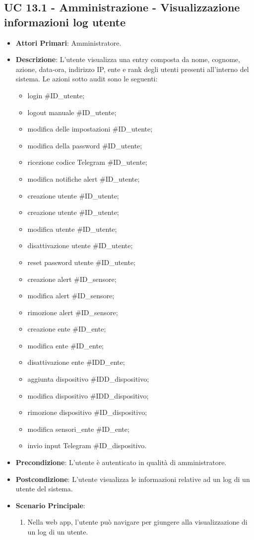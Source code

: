 		\subsection{UC 13.1 - Amministrazione - Visualizzazione informazioni log utente}
		\begin{itemize}
			\item \textbf{Attori Primari}: Amministratore.
			\item \textbf{Descrizione}: L'utente visualizza una entry composta da nome, cognome, azione, data-ora, indirizzo IP, ente e rank degli utenti presenti all'interno del sistema.
			Le azioni sotto audit sono le seguenti: 
			\begin{itemize}
				\item login #ID_utente;
				\item logout manuale #ID_utente;
				\item modifica delle impostazioni #ID_utente;
				\item modifica della password #ID_utente;
				\item ricezione codice Telegram #ID_utente;
				\item modifica notifiche alert #ID_utente;
				\item creazione utente #ID_utente;
				\item creazione utente #ID_utente;
				\item modifica utente #ID_utente;
				\item disattivazione utente #ID_utente;
				\item reset password utente #ID_utente;
				\item creazione alert #ID_sensore;
				\item modifica alert #ID_sensore;
				\item rimozione alert #ID_sensore;
				\item creazione ente #ID_ente;
				\item modifica ente #ID_ente;
				\item disattivazione ente #IDD_ente;
				\item aggiunta dispositivo #IDD_dispositivo;
				\item modifica dispositivo #IDD_dispositivo;
				\item rimozione dispositivo #ID_dispositivo;
				\item modifica sensori_ente #ID_ente;
				\item invio input Telegram #ID_dispositivo.
			\end{itemize}
			\item \textbf{Precondizione}: L'utente è autenticato in qualità di amministratore.
			\item \textbf{Postcondizione}: L'utente visualizza le informazioni relative ad un log di un utente del sistema.
			\item \textbf{Scenario Principale}:
			\begin{enumerate}
				\item Nella web app, l'utente può navigare per giungere alla visualizzazione di un log di un utente.
			\end{enumerate}	
		\end{itemize}
		

